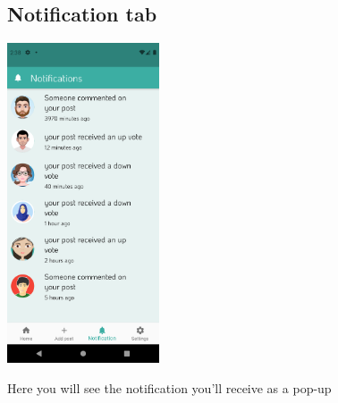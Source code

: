 \documentclass[12pt]{article}
\begin{document}
\begin{figure}[h!]
  \subsection*{Notification tab}
{\includegraphics[width=0.4\textwidth]{./Screenshots/16.PNG}}
  \caption{Here you will see the notification you'll receive as a pop-up}
  \end{figure}
  
\end{document}
